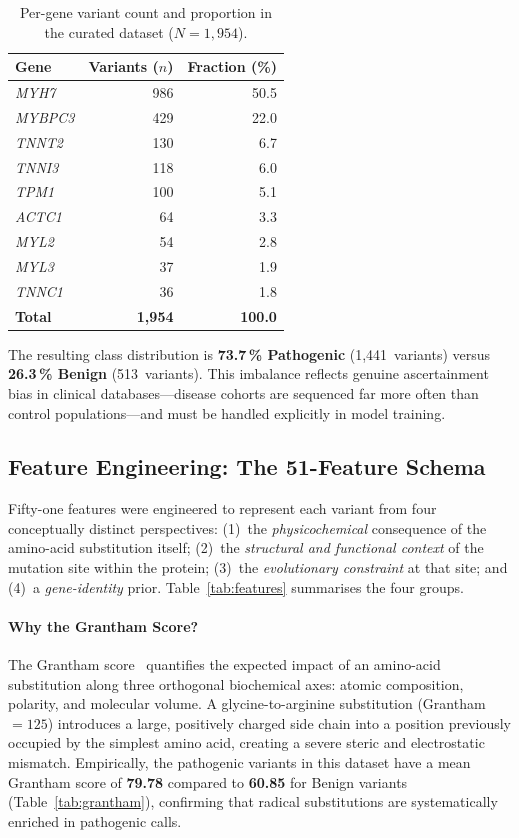 \documentclass[12pt,a4paper]{article}
\begin{document}
\begin{table}[H]
\centering
\caption{Per-gene variant count and proportion in the curated dataset
         ($N = 1{,}954$).}
\label{tab:gene_dist}
\begin{tabular}{@{}lrr@{}}
\toprule
\textbf{Gene} & \textbf{Variants ($n$)} & \textbf{Fraction (\%)} \\
\midrule
\textit{MYH7}    & 986 & 50.5 \\
\textit{MYBPC3}  & 429 & 22.0 \\
\textit{TNNT2}   & 130 &  6.7 \\
\textit{TNNI3}   & 118 &  6.0 \\
\textit{TPM1}    & 100 &  5.1 \\
\textit{ACTC1}   &  64 &  3.3 \\
\textit{MYL2}    &  54 &  2.8 \\
\textit{MYL3}    &  37 &  1.9 \\
\textit{TNNC1}   &  36 &  1.8 \\
\midrule
\textbf{Total}   & \textbf{1,954} & \textbf{100.0} \\
\bottomrule
\end{tabular}
\end{table}

The resulting class distribution is \textbf{73.7\,\% Pathogenic}
(1,441~variants) versus \textbf{26.3\,\% Benign} (513~variants). This
imbalance reflects genuine ascertainment bias in clinical databases—disease
cohorts are sequenced far more often than control populations—and must be
handled explicitly in model training.

\subsection{Feature Engineering: The 51-Feature Schema}
\label{subsec:features}

Fifty-one features were engineered to represent each variant from four
conceptually distinct perspectives: (1)~the \emph{physicochemical}
consequence of the amino-acid substitution itself; (2)~the \emph{structural
and functional context} of the mutation site within the protein; (3)~the
\emph{evolutionary constraint} at that site; and (4)~a \emph{gene-identity}
prior. Table~\ref{tab:features} summarises the four groups.
\paragraph{Why the Grantham Score?}
The Grantham score~\cite{grantham1974} quantifies the expected impact of an
amino-acid substitution along three orthogonal biochemical axes: atomic
composition, polarity, and molecular volume. A glycine-to-arginine
substitution (Grantham $= 125$) introduces a large, positively charged side
chain into a position previously occupied by the simplest amino acid,
creating a severe steric and electrostatic mismatch. Empirically, the
pathogenic variants in this dataset have a mean Grantham score of
\textbf{79.78} compared to \textbf{60.85} for Benign variants
(Table~\ref{tab:grantham}), confirming that radical substitutions are
systematically enriched in pathogenic calls.
\end{document}
